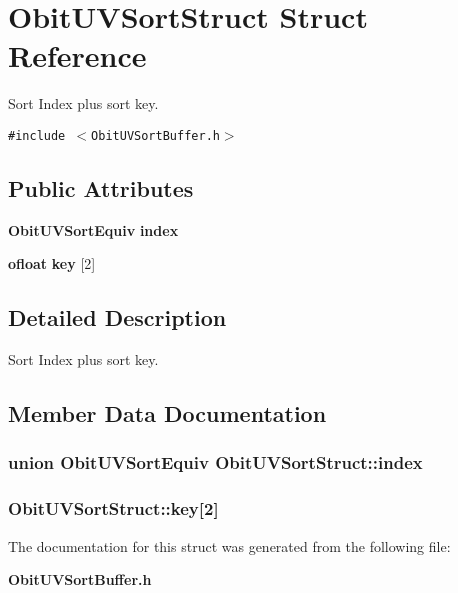 \section{Obit\-UVSort\-Struct Struct Reference}
\label{structObitUVSortStruct}
Sort Index plus sort key.  


{\tt \#include $<$Obit\-UVSort\-Buffer.h$>$}

\subsection*{Public Attributes}
\begin{CompactItemize}
\item 
{\bf Obit\-UVSort\-Equiv} {\bf index}
\item 
{\bf ofloat} {\bf key} [2]
\end{CompactItemize}


\subsection{Detailed Description}
Sort Index plus sort key. 



\subsection{Member Data Documentation}
\subsubsection{\setlength{\rightskip}{0pt plus 5cm}union {\bf Obit\-UVSort\-Equiv} {\bf Obit\-UVSort\-Struct::index}}\label{structObitUVSortStruct_o0}


\subsubsection{ {\bf Obit\-UVSort\-Struct::key}[2]}\label{structObitUVSortStruct_o1}




The documentation for this struct was generated from the following file:\begin{CompactItemize}
\item 
{\bf Obit\-UVSort\-Buffer.h}\end{CompactItemize}

